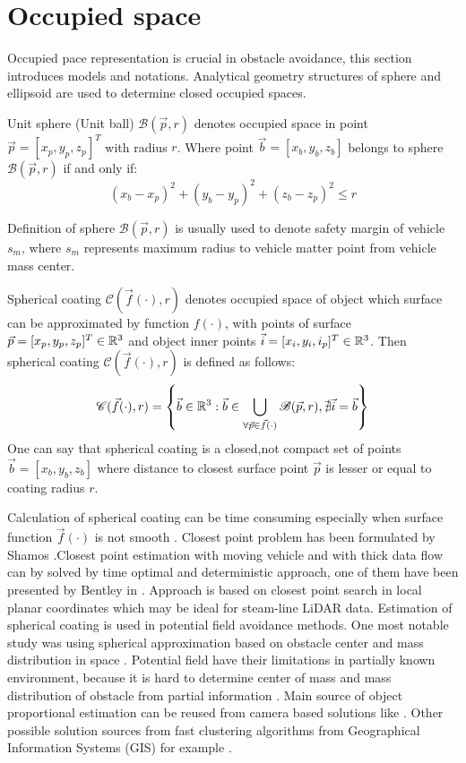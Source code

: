 \section{Occupied space}
\noindent Occupied pace representation is crucial in obstacle avoidance, this section introduces models and notations. Analytical geometry structures of sphere and ellipsoid are used to  determine closed occupied spaces.
\begin{definition}{Unit sphere (Unit ball) $\mathscr{B}(\vec{p},r)$} denotes occupied space in point $\vec{p} = [x_p,y_p,z_p]^T$ with radius $r$. Where point $\vec{b} = [x_b,y_b,z_b]$ belongs to sphere $\mathscr{B}(\vec{p},r)$ if and only if:
\begin{equation}
    (x_b-x_p)^2 + (y_b-y_p)^2 + (z_b-z_p)^2 \le r
\end{equation}    
\end{definition}
Definition of sphere $\mathscr{B}(\vec{p},r)$ is usually used to denote safety margin of vehicle $s_m$, where $s_m$ represents maximum radius to vehicle matter point from vehicle mass center. 
\begin{definition}{Spherical coating $\mathscr{C}(\vec{f}(\cdot),r)$} denotes occupied space of object which surface can be approximated by function $f(\cdot)$, with points of surface $\vec{p}=[x_p,y_p,z_p]^T\in\mathbb{R}^3$ and object inner points $\vec{i}=[x_i,y_i,i_p]^T\in \mathbb{R}^3$. Then spherical coating $\mathscr{C}(\vec{f}(\cdot),r)$ is defined as follows:
\begin{equation}
    \mathscr{C}(\vec{f}(\cdot),r) = \left\{\vec{b} \in \mathbb{R}^3: \vec{b}\in \bigcup_{\forall \vec{p} \in \vec{f}(\cdot)} \mathscr{B}(\vec{p},r), \nexists \vec{i}=\vec{b}  \right\}
\end{equation}
One can say that spherical coating is a closed,not compact set of points $\vec{b} = [x_b,y_b,z_b]$  where distance to closest surface point $\vec{p}$ is lesser or equal to coating radius $r$.    
\end{definition}
\noindent Calculation of spherical coating can be time consuming especially when surface function $\vec{f}(\cdot)$ is not smooth \cite{sommerville2016analytical}. Closest point problem has been formulated by Shamos \cite{shamos1975closest}.Closest point estimation with moving vehicle and with thick data flow can by solved by time optimal and deterministic approach, one of them have been presented by Bentley in \cite{bentley1980optimal}. Approach is based on closest point search in local planar coordinates which may be ideal for steam-line LiDAR data. 
Estimation of spherical coating is used in potential field avoidance methods. One most notable study was using spherical approximation based on obstacle center and mass distribution in space \cite{borenstein1991vector}. Potential field have their limitations in partially known environment, because it is hard to determine center of mass and mass distribution of obstacle from partial information \cite{koren1991potential}. Main source of object proportional estimation can be reused from camera based solutions like \cite{oberkampf1993iterative}. Other possible solution sources from fast clustering algorithms from Geographical Information Systems (GIS) for example \cite{zaiane2002clustering}.

